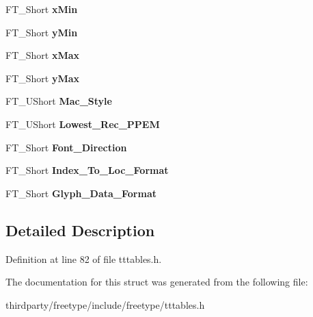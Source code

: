 \begin{DoxyCompactItemize}
F\+T\+\_\+\+Short {\bfseries x\+Min}
\item 
\mbox{\label{struct_t_t___header___ac6aad4966bac8a96c5bc48765b3d694a}} 
F\+T\+\_\+\+Short {\bfseries y\+Min}
\item 
\mbox{\label{struct_t_t___header___a593b9cc3e11532972a7fc96944dd1ae9}} 
F\+T\+\_\+\+Short {\bfseries x\+Max}
\item 
\mbox{\label{struct_t_t___header___a02d236cd8150c00e886a0c487c04dffa}} 
F\+T\+\_\+\+Short {\bfseries y\+Max}
\item 
\mbox{\label{struct_t_t___header___a82f2a5a836b802e44ff712b3afc8745c}} 
F\+T\+\_\+\+U\+Short {\bfseries Mac\+\_\+\+Style}
\item 
\mbox{\label{struct_t_t___header___a1d20801c3482dee2529d294441ed9af3}} 
F\+T\+\_\+\+U\+Short {\bfseries Lowest\+\_\+\+Rec\+\_\+\+P\+P\+EM}
\item 
\mbox{\label{struct_t_t___header___a1cb7d8a2a76ae1acda3ac94bcd555954}} 
F\+T\+\_\+\+Short {\bfseries Font\+\_\+\+Direction}
\item 
\mbox{\label{struct_t_t___header___a05a488607bfae319de096b4bd9cf8c6d}} 
F\+T\+\_\+\+Short {\bfseries Index\+\_\+\+To\+\_\+\+Loc\+\_\+\+Format}
\item 
\mbox{\label{struct_t_t___header___adeeedce4bb708c3e068ed80366ec921d}} 
F\+T\+\_\+\+Short {\bfseries Glyph\+\_\+\+Data\+\_\+\+Format}
\end{DoxyCompactItemize}


\subsection{Detailed Description}


Definition at line 82 of file tttables.\+h.



The documentation for this struct was generated from the following file\+:\begin{DoxyCompactItemize}
\item 
thirdparty/freetype/include/freetype/tttables.\+h\end{DoxyCompactItemize}
